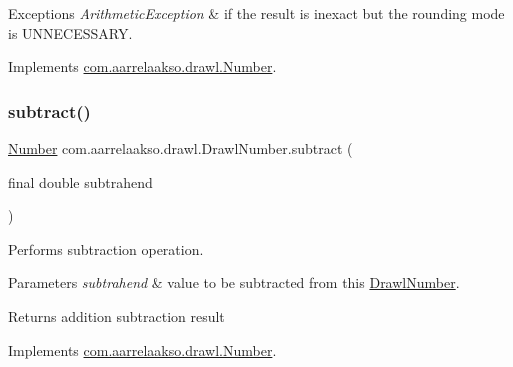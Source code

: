 \begin{DoxyExceptions}{Exceptions}
{\em Arithmetic\+Exception} & if the result is inexact but the rounding mode is U\+N\+N\+E\+C\+E\+S\+S\+A\+RY. \\
\hline
\end{DoxyExceptions}


Implements \hyperlink{interfacecom_1_1aarrelaakso_1_1drawl_1_1_number_aae7cf801905b2510138d37ff932c4d30}{com.\+aarrelaakso.\+drawl.\+Number}.

\mbox{\label{classcom_1_1aarrelaakso_1_1drawl_1_1_drawl_number_ade985c4a55ea33886939801ceacd254c}} 
\subsubsection{\texorpdfstring{subtract()}{subtract()}\hspace{0.1cm}{\footnotesize\ttfamily [3/3]}}
{\footnotesize\ttfamily \hyperlink{interfacecom_1_1aarrelaakso_1_1drawl_1_1_number}{Number} com.\+aarrelaakso.\+drawl.\+Drawl\+Number.\+subtract (\begin{DoxyParamCaption}\item[{final double}]{subtrahend }\end{DoxyParamCaption})}



Performs subtraction operation. 


\begin{DoxyParams}{Parameters}
{\em subtrahend} & value to be subtracted from this \hyperlink{classcom_1_1aarrelaakso_1_1drawl_1_1_drawl_number}{Drawl\+Number}. \\
\hline
\end{DoxyParams}
\begin{DoxyReturn}{Returns}
addition subtraction result 
\end{DoxyReturn}


Implements \hyperlink{interfacecom_1_1aarrelaakso_1_1drawl_1_1_number_ac04969f656d823c91e55a798df7d6913}{com.\+aarrelaakso.\+drawl.\+Number}.

\mbox{\label{classcom_1_1aarrelaakso_1_1drawl_1_1_drawl_number_a5fe84caaf56b210850be966218f70ca9}} 
